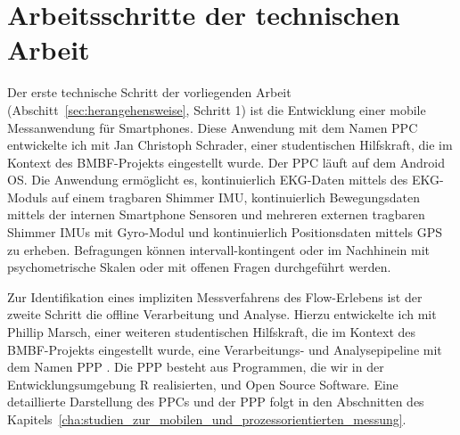

\section{Arbeitsschritte der technischen Arbeit} 

\label{sec:arbeitsschritte_der_technischen_arbeit}

Der erste technische Schritt der vorliegenden Arbeit (Abschitt~\ref{sec:herangehensweise}, Schritt 1) ist die Entwicklung einer mobile Messanwendung für Smartphones. Diese Anwendung mit dem Namen \ac{PPC} \citep{Bogutzky2016} entwickelte ich mit Jan Christoph Schrader, einer studentischen Hilfskraft, die im Kontext des \acs{BMBF}-Projekts eingestellt wurde. Der \ac{PPC} läuft auf dem Android OS. Die Anwendung ermöglicht es, kontinuierlich \ac{EKG}-Daten mittels des \ac{EKG}-Moduls auf einem tragbaren Shimmer \ac{IMU}, kontinuierlich Bewegungsdaten mittels der internen Smartphone Sensoren und mehreren externen tragbaren Shimmer \ac{IMU}s mit Gyro-Modul und kontinuierlich Positionsdaten mittels \acs{GPS} zu erheben. Befragungen können intervall-kontingent oder im Nachhinein mit psychometrische Skalen oder mit offenen Fragen durchgeführt werden.

Zur Identifikation eines impliziten Messverfahrens des Flow-Erlebens ist der zweite Schritt die offline Verarbeitung und Analyse. Hierzu entwickelte ich mit Phillip Marsch, einer weiteren studentischen Hilfskraft, die im Kontext des \acs{BMBF}-Projekts eingestellt wurde, eine Verarbeitungs- und Analysepipeline mit dem Namen \ac{PPP} \citep{Bogutzky2016a}. Die \ac{PPP} besteht aus Programmen, die wir in der Entwicklungsumgebung R realisierten, und Open Source Software. Eine detaillierte Darstellung des \ac{PPC}s und der \ac{PPP} folgt in den Abschnitten des Kapitels~\ref{cha:studien_zur_mobilen_und_prozessorientierten_messung}.

